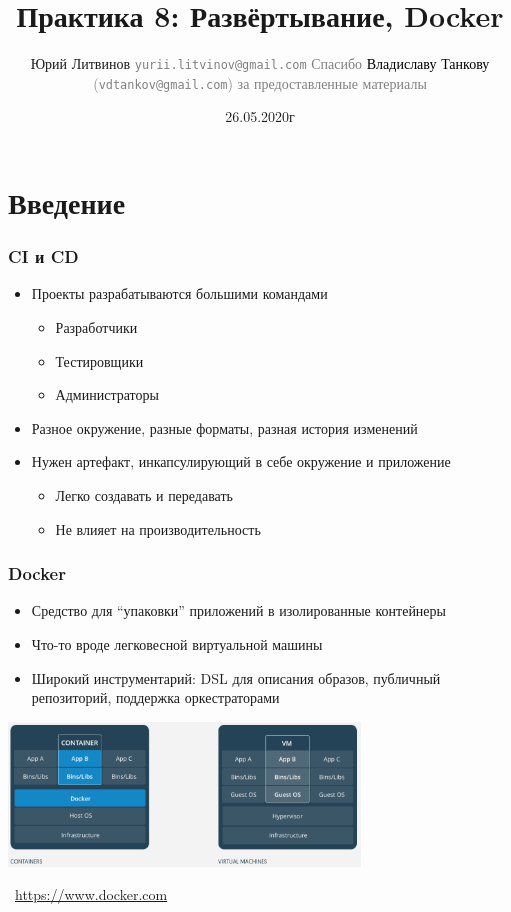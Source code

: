 \documentclass[xetex,mathserif,serif]{beamer}
\title{Практика 8: Развёртывание, Docker}
\author[Юрий Литвинов]{Юрий Литвинов \newline
    \textcolor{gray}{\small\texttt{yurii.litvinov@gmail.com}} \newline
    \textcolor{gray}{\small Спасибо \textcolor{black}{Владиславу Танкову} (\texttt{vdtankov@gmail.com}) за  предоставленные материалы}
}
\date{26.05.2020г}
\newcommand{\attribution}[1] {
    \vspace{-5mm}\begin{flushright}\begin{scriptsize}\textcolor{gray}{\textcopyright\, #1}\end{scriptsize}\end{flushright}
}
\begin{document}
    \frame{\titlepage}

    \section{Введение}

    \begin{frame}
        \frametitle{CI и CD}
        \begin{itemize}
            \item Проекты разрабатываются большими командами
            \begin{itemize}
                \item Разработчики
                \item Тестировщики
                \item Администраторы
            \end{itemize}
            \item Разное окружение, разные форматы, разная история изменений
            \item Нужен артефакт, инкапсулирующий в себе окружение и приложение
            \begin{itemize}
                \item Легко создавать и передавать
                \item Не влияет на производительность
            \end{itemize}
        \end{itemize}
    \end{frame}

    \begin{frame}
        \frametitle{Docker}
        \begin{itemize}
            \item Средство для ``упаковки'' приложений в изолированные контейнеры
            \item Что-то вроде легковесной виртуальной машины
            \item Широкий инструментарий: DSL для описания образов, публичный репозиторий, поддержка оркестраторами
        \end{itemize}
        \begin{center}
            \includegraphics[width=0.7\textwidth]{docker.png}
            \attribution{\url{https://www.docker.com}}
        \end{center}
    \end{frame}
\end{document}
